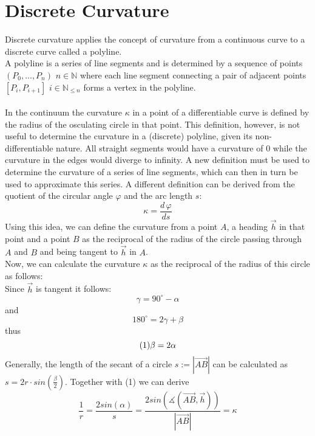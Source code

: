 \section{Discrete Curvature}


Discrete curvature applies the concept of curvature from a continuous curve to a discrete curve called a polyline.\\
A polyline is a series of line segments and is determined by a sequence of points $(P_0,...,P_n)$ $n \in \mathbb{N}$ where each line segment connecting a pair of adjacent points $[P_i,P_{i+1}]$ $i \in \mathbb{N}_{\le n}$ forms a vertex in the polyline.\\
\\In the continuum the curvature $\kappa$ in a point of a differentiable curve is defined by the radius of the osculating circle in that point. This definition, however, is not useful to determine the curvature in a (discrete) polyline, given its non-differentiable nature. All straight segments would have a curvature of $0$ while the curvature in the edges would diverge to infinity. A new definition must be used to determine the curvature of a series of line segments, which can then in turn be used to approximate this series. A different definition can be derived from the quotient of the circular angle $\varphi$ and the arc length $s$:
$$\kappa  =  {\frac{{d\,\varphi}}{{ds}}}$$
Using this idea, we can define the curvature from a point $A$, a heading  $\vec h$ in that point and a point $B$ as the reciprocal of the radius of the circle passing through $A$ and $B$ and being tangent to  $\vec h$ in $A$.
 \\ Now, we can calculate the curvature $\kappa$ as the reciprocal of the radius of this circle as follows:\\Since $\vec h$ is tangent it follows: $$\gamma=90^{\circ} - \alpha$$ and $$180^{\circ}=2\gamma+\beta$$ thus $$(1) \space \beta = 2 \alpha$$
Generally, the length of the secant of a circle $s:=|\vec{AB}|$ can be calculated as
$s = 2r \cdot  sin(\frac{\beta}{2})$. Together with (1) we can derive
$$\frac{1}{r} = \frac{2sin(\alpha)}{s} = \frac{2sin(\measuredangle(\vec{AB},\vec h))}{|\vec{AB}|} = \kappa$$\\

